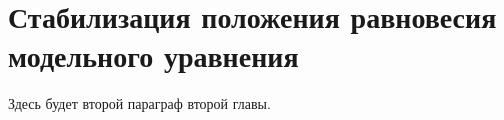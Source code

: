 \section{Стабилизация положения равновесия модельного уравнения} \label{p22}

Здесь будет второй параграф второй главы.